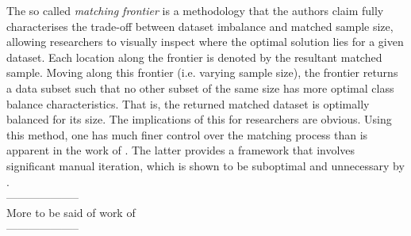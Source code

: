 {The so called {\it matching frontier} is a methodology that the authors claim fully characterises the trade-off between dataset imbalance and matched sample size, allowing researchers to visually inspect where the optimal solution lies for a given dataset. Each location along the frontier is denoted by the resultant matched sample. Moving along this frontier (i.e. varying sample size), the frontier returns a data subset such that no other subset of the same size has more optimal class balance characteristics. That is, the returned matched dataset is optimally balanced for its size. The implications of this for researchers are obvious. Using this method, one has much finer control over the matching process than is apparent in the work of  \cite{stuart2010matching}. The latter provides a framework that involves significant manual iteration, which is shown to be suboptimal and unnecessary by \cite{king2014balance}.\\
--------------------\\
{\color{red}
More to be said of work of \cite{king2014balance}\\}
--------------------}
